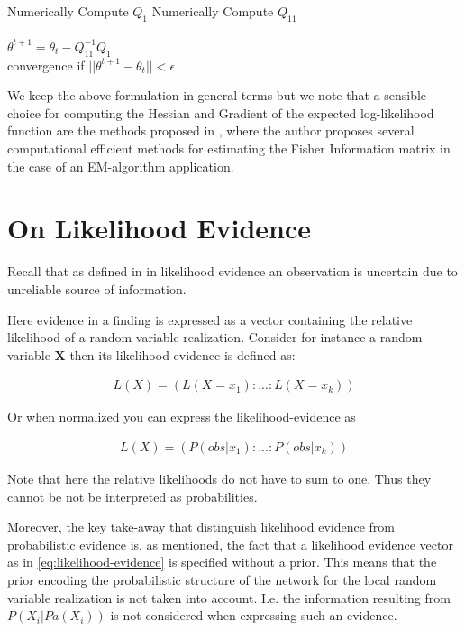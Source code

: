 \documentclass[11pt]{article}
\begin{document}
\begin{article}
\begin{algorithm*}[h!]
\begin{multicols}{2}
\begin{algorithmic}[1]
   \State Numerically Compute $Q_1$
   \State Numerically Compute $Q_{11}$\\

   \\
      \State $\theta^{t+1}= \theta_{t} - Q_{11}^{-1} Q_1$\\
      \State convergence if $||\theta^{t+1} - \theta_{t}|| < \epsilon$
   \EndForAll
\end{algorithmic}
\end{multicols}
\end{algorithm*}

We keep the above formulation in general terms but we note that a
sensible choice for computing the Hessian and Gradient of the
expected log-likelihood function are the methods proposed in
\cite{meng2016method}, where the author proposes several
computational efficient methods for estimating the Fisher
Information matrix in the case of an EM-algorithm application. 

\newpage

\section{On Likelihood Evidence}
\label{likelihood-em}
Recall that as defined in \cite{Mrad_2015} in likelihood evidence an
observation is uncertain due to unreliable source of information.

Here evidence in a finding is expressed as a vector containing the
relative likelihood of a random variable realization. Consider for
instance a random variable \textbf{X} then its likelihood evidence is
defined as:

\begin{align} \label{eq:likelihood-evidence}
 L(X) = (L(X = x_1): ... : L(X = x_k))
\end{align}

Or when normalized you can express the likelihood-evidence as 

\begin{align} \label{eq:normalized-likelihood-evidence}
 L(X) = (P(obs | x_1): ... : P(obs | x_k))
\end{align}

Note that here the relative likelihoods do not have to sum to
one. Thus they cannot be not be interpreted as probabilities.

Moreover, the key take-away that distinguish likelihood evidence
from probabilistic evidence is, as mentioned, the fact that a
likelihood evidence vector as in \ref{eq:likelihood-evidence} is
specified without a prior. This means that the prior encoding the
probabilistic structure of the network for the local random
variable realization is not taken into account. I.e. the
information resulting from \(P(X_i|Pa(X_i))\) is not considered when
expressing such an evidence.


\end{article}
\end{document}
